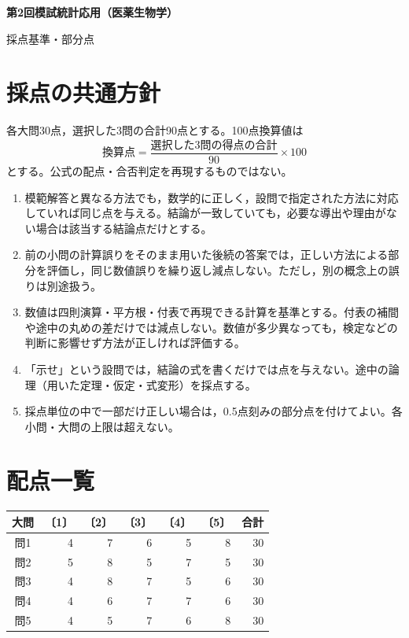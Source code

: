 \documentclass[a4paper,11pt]{ltjsarticle}
\begin{document}
\begin{center}
{\Large\bfseries 第2回模試\quad 統計応用（医薬生物学）}\par\medskip
{\large 採点基準・部分点}
\end{center}
\section*{採点の共通方針}
各大問30点，選択した3問の合計90点とする。100点換算値は
\[
\text{換算点}=\frac{\text{選択した3問の得点の合計}}{90}\times100
\]
とする。公式の配点・合否判定を再現するものではない。
\begin{enumerate}[label=\arabic*.,leftmargin=2em,itemsep=0.6em]
\item 模範解答と異なる方法でも，数学的に正しく，設問で指定された方法に対応していれば同じ点を与える。結論が一致していても，必要な導出や理由がない場合は該当する結論点だけとする。
\item 前の小問の計算誤りをそのまま用いた後続の答案では，正しい方法による部分を評価し，同じ数値誤りを繰り返し減点しない。ただし，別の概念上の誤りは別途扱う。
\item 数値は四則演算・平方根・付表で再現できる計算を基準とする。付表の補間や途中の丸めの差だけでは減点しない。数値が多少異なっても，検定などの判断に影響せず方法が正しければ評価する。
\item 「示せ」という設問では，結論の式を書くだけでは点を与えない。途中の論理（用いた定理・仮定・式変形）を採点する。
\item 採点単位の中で一部だけ正しい場合は，0.5点刻みの部分点を付けてよい。各小問・大問の上限は超えない。
\end{enumerate}
\section*{配点一覧}
\begin{center}
\begin{tabular}{crrrrrr}
\toprule
大問 & 〔1〕 & 〔2〕 & 〔3〕 & 〔4〕 & 〔5〕 & 合計\\
\midrule
問1 & 4 & 7 & 6 & 5 & 8 & 30\\
問2 & 5 & 8 & 5 & 7 & 5 & 30\\
問3 & 4 & 8 & 7 & 5 & 6 & 30\\
問4 & 4 & 6 & 7 & 7 & 6 & 30\\
問5 & 4 & 5 & 7 & 6 & 8 & 30\\
\bottomrule
\end{tabular}
\end{center}
\newpage
\end{document}

